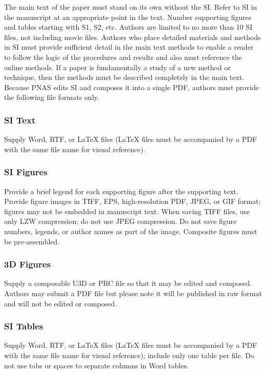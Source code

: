 \documentclass[9pt,twocolumn,twoside]{pnas-new}
\begin{document}
The main text of the paper must stand on its own without the SI. Refer to SI in the manuscript at an appropriate point in the text. Number supporting figures and tables starting with S1, S2, etc. Authors are limited to no more than 10 SI files, not including movie files. Authors who place detailed materials and methods in SI must provide sufficient detail in the main text methods to enable a reader to follow the logic of the procedures and results and also must reference the online methods. If a paper is fundamentally a study of a new method or technique, then the methods must be described completely in the main text. Because PNAS edits SI and composes it into a single PDF, authors must provide the following file formats only.

\subsubsection*{SI Text}

Supply Word, RTF, or LaTeX files (LaTeX files must be accompanied by a PDF with the same file name for visual reference).

\subsubsection*{SI Figures}

Provide a brief legend for each supporting figure after the supporting text. Provide figure images in TIFF, EPS, high-resolution PDF, JPEG, or GIF format; figures may not be embedded in manuscript text. When saving TIFF files, use only LZW compression; do not use JPEG compression. Do not save figure numbers, legends, or author names as part of the image. Composite figures must be pre-assembled.

\subsubsection*{3D Figures}

Supply a composable U3D or PRC file so that it may be edited and composed. Authors may submit a PDF file but please note it will be published in raw format and will not be edited or composed.

\subsubsection*{SI Tables}

Supply Word, RTF, or LaTeX files (LaTeX files must be accompanied by a PDF with the same file name for visual reference); include only one table per file. Do not use tabs or spaces to separate columns in Word tables.
\end{document}
